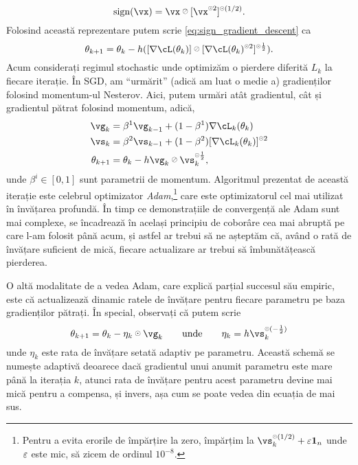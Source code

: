 \documentclass[../../book-main_ro.tex]{subfiles}
\begin{document}
\begin{equation}
    \sign(\vx) = \vx \haddiv [\vx^{\hada 2}]^{\hada (1/2)}.
\end{equation}
Folosind această reprezentare putem scrie \eqref{eq:sign_gradient_descent} ca
\begin{equation}
    \theta_{k + 1} = \theta_{k} - h ([\nabla \cL(\theta_{k})] \haddiv [\nabla
    \cL(\theta_{k})^{\hada 2}]^{\hada \frac{1}{2}}).
\end{equation}
Acum considerați regimul stochastic unde optimizăm o pierdere diferită \(L_{k}\) la fiecare iterație. În SGD, am ``urmărit'' (adică am luat o medie a) gradienților folosind momentum-ul Nesterov. Aici, putem urmări atât gradientul, cât și gradientul pătrat folosind momentum, adică,
\begin{align}
    \vg_{k}
    &= \beta^{1}\vg_{k - 1} + (1 - \beta^{1})\nabla \cL_{k}(\theta_{k}) \\ 
    \vs_{k}
    &= \beta^{2}\vs_{k - 1} + (1 - \beta^{2})[\nabla \cL_{k}(\theta_{k})]^{\hada 2}  \\
    \theta_{k + 1}
    &= \theta_{k} - h\vg_{k}\haddiv\vs_{k}^{\hada \frac{1}{2}},
\end{align}
unde \(\beta^{i} \in [0, 1]\) sunt parametrii de momentum. Algoritmul prezentat de această iterație este celebrul optimizator \textit{Adam},\footnote{Pentru a evita erorile de împărțire la zero, împărțim la \(\vs_{k}^{\hada (1/2)} + \eps \vone_{n}\) unde \(\varepsilon\) este mic, să zicem de ordinul \(10^{-8}\).} care este optimizatorul cel mai utilizat în învățarea profundă. În timp ce demonstrațiile de convergență ale Adam sunt mai complexe, se încadrează în același principiu de coborâre cea mai abruptă pe care l-am folosit până acum, și astfel ar trebui să ne așteptăm că, având o rată de învățare suficient de mică, fiecare actualizare ar trebui să îmbunătățească pierderea.

O altă modalitate de a vedea Adam, care explică parțial succesul său empiric, este că actualizează dinamic ratele de învățare pentru fiecare parametru pe baza gradienților pătrați. În special, observați că putem scrie
\begin{equation}
    \theta_{k + 1} = \theta_{k} - \eta_{k} \hada \vg_{k} \qquad \text{unde}
    \qquad \eta_{k} = h \vs_{k}^{\hada (-\frac{1}{2})}
\end{equation}
unde \(\eta_{k}\) este rata de învățare setată adaptiv pe parametru. Această schemă se numește adaptivă deoarece dacă gradientul unui anumit parametru este mare până la iterația \(k\), atunci rata de învățare pentru acest parametru devine mai mică pentru a compensa, și invers, așa cum se poate vedea din ecuația de mai sus.
\end{document}

